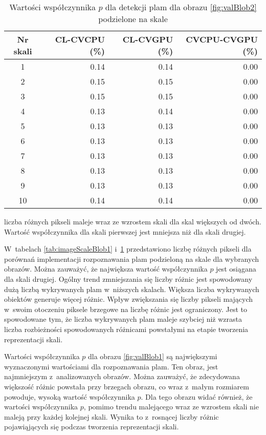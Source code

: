 \begin{center}
\begin{table}
\centering
\caption{Wartości współczynnika $ p $ dla detekcji plam dla obrazu \ref{fig:valBlob2} podzielone na skale}
\label{tab:imageScaleBlob2}
\begin{tabular}{|c|r|r|r|}
\hline
Nr skali & CL-CVCPU (\%) & CL-CVGPU (\%) & CVCPU-CVGPU (\%) \\ \hline
1        & 0.14     & 0.14     & 0.00       \\ \hline
2        & 0.15     & 0.15     & 0.00        \\ \hline
3        & 0.15     & 0.15     & 0.00       \\ \hline
4        & 0.13     & 0.14     & 0.00       \\ \hline
5        & 0.13     & 0.13     & 0.00       \\ \hline
6        & 0.13     & 0.13     & 0.00       \\ \hline
7        & 0.13     & 0.13     & 0.00       \\ \hline
8        & 0.13     & 0.13     & 0.00       \\ \hline
9        & 0.13     & 0.13     & 0.00       \\ \hline
10       & 0.14     & 0.14     & 0.00       \\ \hline
\end{tabular}
\end{table}
\end{center}

liczba różnych pikseli maleje wraz ze wzrostem skali dla skal większych od dwóch. Wartość współczynnika dla skali pierwszej jest mniejsza niż dla skali drugiej. 

W~tabelach \ref{tab:imageScaleBlob1} i~\ref{tab:imageScaleBlob2} przedstawiono liczbę różnych pikseli dla porównań implementacji rozpoznawania plam podzieloną na skale dla wybranych obrazów. Można zauważyć, że największa wartość współczynnika $ p $ jest osiągana dla skali drugiej. Ogólny trend zmniejszania się liczby różnic jest spowodowany dużą liczbą wykrywanych plam w~niższych skalach. Większa liczba wykrywanych obiektów generuje więcej różnic. Wpływ zwiększania się liczby pikseli mających w~swoim otoczeniu piksele brzegowe na liczbę różnic jest ograniczony. Jest to spowodowane tym, że liczba wykrywanych plam maleje szybciej niż wzrasta liczba rozbieżności spowodowanych różnicami powstałymi na etapie tworzenia reprezentacji skali.

Wartości współczynnika $ p $ dla obrazu \ref{fig:valBlob1} są największymi wyznaczonymi wartościami dla rozpoznawania plam. Ten obraz, jest najmniejszym z~analizowanych obrazów. Można zauważyć, że zdecydowana większość różnic powstała przy brzegach obrazu, co wraz z~małym rozmiarem powoduje, wysoką wartość współczynnika $ p $. Dla tego obrazu widać również, że wartości współczynnika $ p $, pomimo trendu malejącego wraz ze wzrostem skali nie maleją przy każdej kolejnej skali. Wynika to z~rosnącej liczby różnic pojawiąjących się podczas tworzenia reprezentacji skali.

